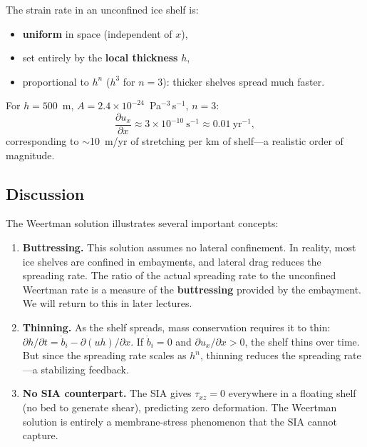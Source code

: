 \documentclass[11pt]{article}
\begin{document}
\begin{tcolorbox}[
  colback=orange!5,
  colframe=orange!60!black,
  title={\textbf{Key result: the Weertman spreading rate}}
]
The strain rate in an unconfined ice shelf is:
\begin{itemize}[nosep]
  \item \textbf{uniform} in space (independent of $x$),
  \item set entirely by the \textbf{local thickness} $h$,
  \item proportional to $h^n$ ($h^3$ for $n = 3$): thicker shelves spread much faster.
\end{itemize}
For $h = 500$~m, $A = 2.4\times10^{-24}$~Pa$^{-3}$\,s$^{-1}$, $n = 3$:
\begin{equation}
  \frac{\partial u_x}{\partial x} \approx 3 \times 10^{-10}~\text{s}^{-1} \approx 0.01~\text{yr}^{-1},
\end{equation}
corresponding to $\sim$10~m/yr of stretching per km of shelf---a realistic order of magnitude.
\end{tcolorbox}

\subsection{Discussion}

The Weertman solution illustrates several important concepts:
\begin{enumerate}
  \item \textbf{Buttressing.}  This solution assumes no lateral confinement.  In reality, most ice shelves are confined in embayments, and lateral drag reduces the spreading rate.  The ratio of the actual spreading rate to the unconfined Weertman rate is a measure of the \textbf{buttressing} provided by the embayment.  We will return to this in later lectures.

  \item \textbf{Thinning.}  As the shelf spreads, mass conservation requires it to thin: $\partial h/\partial t = \dot{b}_i - \partial(uh)/\partial x$.  If $\dot{b}_i = 0$ and $\partial u_x/\partial x > 0$, the shelf thins over time.  But since the spreading rate scales as $h^n$, thinning reduces the spreading rate---a stabilizing feedback.

  \item \textbf{No SIA counterpart.}  The SIA gives $\tau_{xz} = 0$ everywhere in a floating shelf (no bed to generate shear), predicting zero deformation.  The Weertman solution is entirely a membrane-stress phenomenon that the SIA cannot capture.
\end{enumerate}
\end{document}
